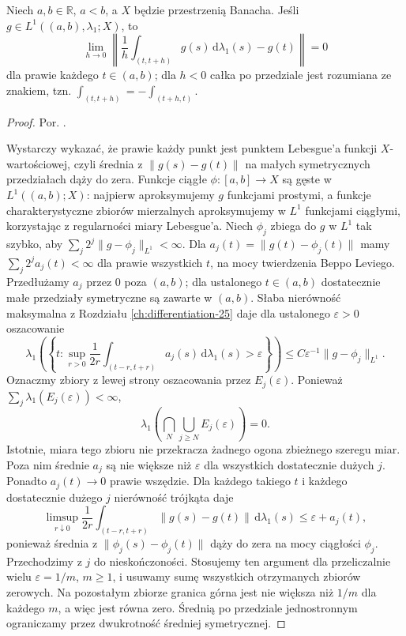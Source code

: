 \begin{lemat}
\label{lem:bochner-differentiation-30}
Niech $a,b\in\mathbb R$, $a<b$, a $X$ będzie
przestrzenią Banacha. Jeśli $g\in L^1((a,b),\lambda_1;X)$, to
\[
 \lim_{h\to0}\left\|
 \frac1h\int_{(t,t+h)}g(s)\,\mathrm d\lambda_1(s)-g(t)
 \right\|=0
\]
dla prawie każdego $t\in(a,b)$; dla $h<0$ całka
po przedziale jest rozumiana ze znakiem, tzn.
$\int_{(t,t+h)}=-\int_{(t+h,t)}$.
\end{lemat}
\begin{proof}
Por. .

Wystarczy wykazać, że prawie każdy punkt jest
punktem Lebesgue'a funkcji $X$-wartościowej, czyli
średnia z $\|g(s)-g(t)\|$ na małych symetrycznych
przedziałach dąży do zera. Funkcje ciągłe
$\phi:[a,b]\to X$ są gęste w $L^1((a,b);X)$:
najpierw aproksymujemy $g$ funkcjami prostymi,
a funkcje charakterystyczne zbiorów mierzalnych
aproksymujemy w $L^1$ funkcjami ciągłymi,
korzystając z regularności miary Lebesgue'a.
Niech $\phi_j$ zbiega do $g$ w $L^1$ tak szybko, aby
$\sum_j2^j\|g-\phi_j\|_{L^1}<\infty$.
Dla $a_j(t)=\|g(t)-\phi_j(t)\|$ mamy
$\sum_j2^j a_j(t)<\infty$ dla prawie wszystkich $t$,
na mocy twierdzenia Beppo Leviego. Przedłużamy
$a_j$ przez $0$ poza $(a,b)$; dla ustalonego
$t\in(a,b)$ dostatecznie małe przedziały
symetryczne są zawarte w $(a,b)$.
Słaba nierówność maksymalna z Rozdziału
\ref{ch:differentiation-25} daje dla ustalonego
$\varepsilon>0$ oszacowanie
\[
 \lambda_1\!\left(\left\{t:
 \sup_{r>0}\frac1{2r}\int_{(t-r,t+r)}a_j(s)
 \,\mathrm d\lambda_1(s)>\varepsilon\right\}\right)
 \le C\varepsilon^{-1}\|g-\phi_j\|_{L^1}.
\]
Oznaczmy zbiory z lewej strony oszacowania przez
$E_j(\varepsilon)$. Ponieważ
$\sum_j\lambda_1(E_j(\varepsilon))<\infty$,
\[
 \lambda_1\left(\bigcap_N\bigcup_{j\ge N}E_j(\varepsilon)\right)=0.
\]
Istotnie, miara tego zbioru nie przekracza żadnego
ogona zbieżnego szeregu miar. Poza nim średnie
$a_j$ są nie większe niż $\varepsilon$ dla wszystkich
dostatecznie dużych $j$. Ponadto $a_j(t)\to0$
prawie wszędzie. Dla każdego takiego $t$ i każdego
dostatecznie dużego $j$ nierówność trójkąta daje
\[
 \limsup_{r\downarrow0}\frac1{2r}
 \int_{(t-r,t+r)}\|g(s)-g(t)\|\,\mathrm d\lambda_1(s)
 \le\varepsilon+a_j(t),
\]
ponieważ średnia z $\|\phi_j(s)-\phi_j(t)\|$
dąży do zera na mocy ciągłości $\phi_j$.
Przechodzimy z $j$ do nieskończoności. Stosujemy
ten argument dla przeliczalnie wielu $\varepsilon=1/m$,
$m\ge1$, i usuwamy sumę wszystkich otrzymanych
zbiorów zerowych. Na pozostałym zbiorze granica
górna jest nie większa niż $1/m$ dla każdego $m$,
a więc jest równa zero.
Średnią po przedziale jednostronnym ograniczamy
przez dwukrotność średniej symetrycznej.
\end{proof}

